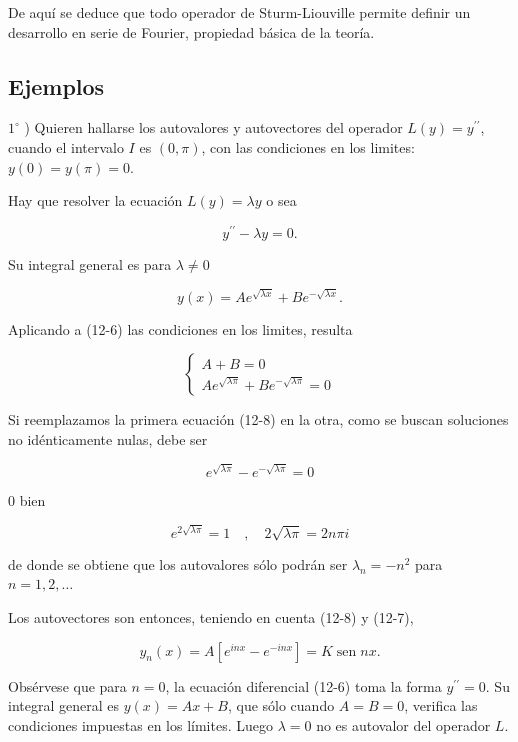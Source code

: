 \documentclass[10pt]{article}
\theoremstyle{plain}
\theoremstyle{definition}
\theoremstyle{remark}
\begin{document}
De aquí se deduce que todo operador de Sturm-Liouville permite definir un desarrollo en serie de Fourier, propiedad básica de la teoría.

\subsection*{Ejemplos}
$1^{\circ}$ ) Quieren hallarse los autovalores y autovectores del operador $L(y)=y^{\prime \prime}$, cuando el intervalo $I$ es $(0, \pi)$, con las condiciones en los limites: $y(0)=y(\pi)=0$.

Hay que resolver la ecuación $L(y)=\lambda y$ o sea


\begin{equation*}
y^{\prime \prime}-\lambda y=0 . \tag{12-6}
\end{equation*}


Su integral general es para $\lambda \neq 0$


\begin{equation*}
y(x)=A e^{\sqrt{\lambda x}}+B e^{-\sqrt{\lambda x}} . \tag{12-7}
\end{equation*}


Aplicando a (12-6) las condiciones en los limites, resulta

\[
\left\{\begin{array}{l}
A+B=0  \tag{12-8}\\
A e^{\sqrt{\lambda \pi}}+B e^{-\sqrt{\lambda \pi}}=0
\end{array}\right.
\]

Si reemplazamos la primera ecuación (12-8) en la otra, como se buscan soluciones no idénticamente nulas, debe ser

$$
e^{\sqrt{\lambda \pi}}-e^{-\sqrt{\lambda \pi}}=0
$$

0 bien

$$
e^{2 \sqrt{\lambda \pi}}=1 \quad, \quad 2 \sqrt{\lambda \pi}=2 n \pi i
$$

de donde se obtiene que los autovalores sólo podrán ser $\lambda_{n}=-n^{2}$ para $n=1,2, \ldots$

Los autovectores son entonces, teniendo en cuenta (12-8) y (12-7),

$$
y_{n}(x)=A\left[e^{i n x}-e^{-i n x}\right]=K \operatorname{sen} n x .
$$

Obsérvese que para $n=0$, la ecuación diferencial (12-6) toma la forma $y^{\prime \prime}=0$. Su integral general es $y(x)=A x+B$, que sólo cuando $A=B=0$, verifica las condiciones impuestas en los límites. Luego $\lambda=0$ no es autovalor del operador $L$.
\end{document}
